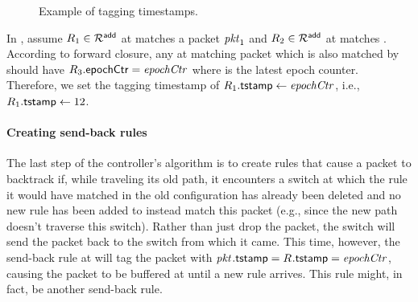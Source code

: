 \begin{figure}
    \centering
	\begin{subfigure}[b]{0.75\textwidth}
        \resizebox{\linewidth}{!}{\small}
        \caption{}
        \label{fig:tagging_example:a}
        \end{subfigure}
	\begin{subfigure}[b]{0.75\textwidth}
          \resizebox{\linewidth}{!}{\small}
          \caption{}
          \label{fig:tagging_example:b}
        \end{subfigure}
        \caption{Example of tagging timestamps.}
        \label{fig:tagging_example}
\end{figure}

In , assume $\ruleID{1} \in \addRules$
at  matches a packet $\pktID{1}$ and $\ruleID{2} \in
\addRules$ at  matches . According to forward
closure, any  at  matching packet 
which is also matched by  should have
$\ruleID{3}{\epochField} = \epochIdx$ where \epochIdx is the latest
epoch counter. Therefore, we set the tagging timestamp of
$\ruleID{1}{\tagTmpField} \gets \epochIdx$, i.e.,
$\ruleID{1}{\tagTmpField} \gets 12$.

\medskip

\hspace*{-\parindent}

\paragraph{Creating send-back rules}
The last step of the controller's algorithm is to create rules that
cause a packet to backtrack if, while traveling its old path, it
encounters a switch  at which the rule it would have
matched in the old configuration has already been deleted and no new
rule has been added to instead match this packet (e.g., since the new
path doesn't traverse this switch).  Rather than just drop the packet,
the switch will send the packet back to the switch  from
which it came.  This time, however, the send-back rule  at
 will tag the packet with $\pktID{}{\pktTmpField} =
\ruleID{}{\tagTmpField} = \epochIdx$, causing the packet to be
buffered at  until a new rule arrives.  This rule might,
in fact, be another send-back rule.

